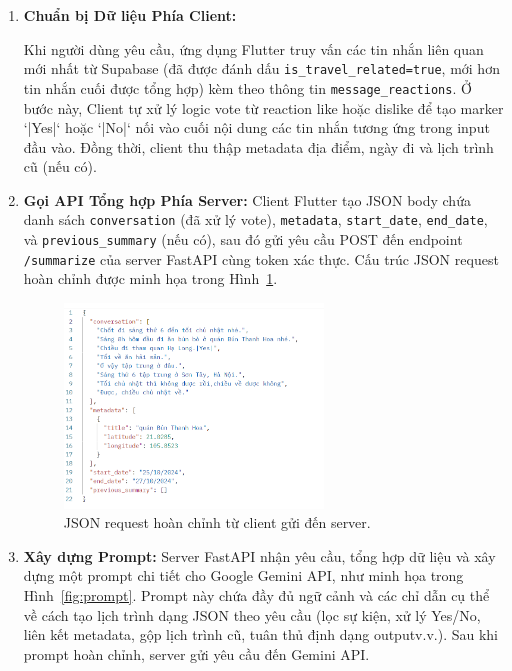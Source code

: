 \begin{enumerate}
    \item \textbf{Chuẩn bị Dữ liệu Phía Client:}

    Khi người dùng yêu cầu, ứng dụng Flutter truy vấn các tin nhắn liên quan mới nhất từ Supabase (đã được đánh dấu \texttt{is\_travel\_related=true}, mới hơn tin nhắn cuối được tổng hợp) kèm theo thông tin \texttt{message\_reactions}. Ở bước này, Client tự xử lý logic vote từ reaction like hoặc dislike để tạo marker `|Yes|` hoặc `|No|` nối vào cuối nội dung các tin nhắn tương ứng trong input đầu vào. Đồng thời, client thu thập metadata địa điểm, ngày đi và lịch trình cũ (nếu có).


    \item \textbf{Gọi API Tổng hợp Phía Server:} Client Flutter tạo JSON body chứa danh sách \texttt{conversation} (đã xử lý vote), \texttt{metadata}, \texttt{start\_date}, \texttt{end\_date}, và \texttt{previous\_summary} (nếu có), sau đó gửi yêu cầu POST đến endpoint \texttt{/summarize} của server FastAPI cùng token xác thực. Cấu trúc JSON request hoàn chỉnh được minh họa trong Hình~\ref{fig:input}. %
    \begin{figure}[H]
        \centering
        \includegraphics[width=0.65\textwidth]{figures/c4/input.png}
        \caption{JSON request hoàn chỉnh từ client gửi đến server.}
        \label{fig:input}
    \end{figure}
    \item \textbf{Xây dựng Prompt:} Server FastAPI nhận yêu cầu, tổng hợp dữ liệu và xây dựng một prompt chi tiết cho Google Gemini API, như minh họa trong Hình~\ref{fig:prompt}. Prompt này chứa đầy đủ ngữ cảnh và các chỉ dẫn cụ thể về cách tạo lịch trình dạng JSON theo yêu cầu (lọc sự kiện, xử lý Yes/No, liên kết metadata, gộp lịch trình cũ, tuân thủ định dạng outputv.v.). Sau khi prompt hoàn chỉnh, server gửi yêu cầu đến Gemini API. %

\end{enumerate}
